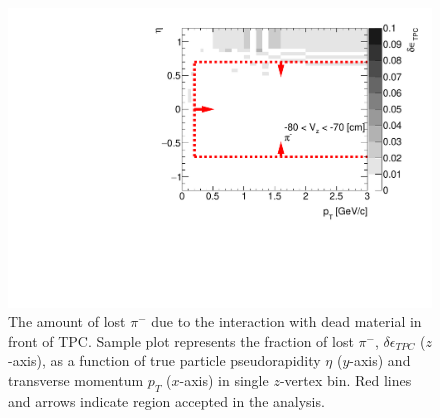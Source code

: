 \begin{figure}[h!]%
	\centering
	\includegraphics[width=0.9\linewidth,page=9]{graphics/systematicsEfficiency/deadMaterial/secondaries_Unbinned_SDCD_.pdf}\vspace*{-8pt}
	\caption[The amount of lost $\pi^-$ due to the interaction with dead material in front of TPC as a function of $p_T$, $\eta$ in sample $z$-vertex bin in CD and SD]{The amount of lost $\pi^-$ due to the interaction with dead material in front of TPC. Sample plot represents the fraction of lost $\pi^-$, $\delta\epsilon_{ TPC}$ ($z$-axis), as a function of true particle pseudorapidity $\eta$ ($y$-axis) and transverse momentum $p_{T}$ ($x$-axis) in single $z$-vertex bin. Red lines and arrows indicate region accepted in the analysis.}\label{fig:dead_materialCDSD3D}
\end{figure}

